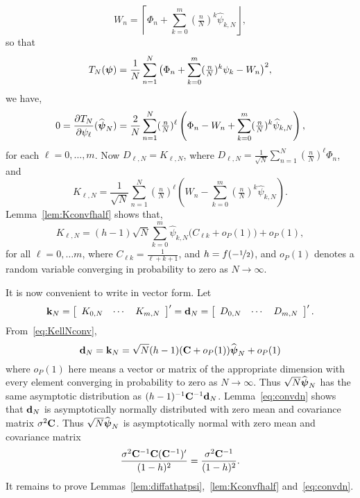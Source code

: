 \documentclass[aap,preprint]{imsart}
\newcommand{\round}[1]{{\left\lceil #1 \right\rfloor}}
\begin{document}
\begin{equation}\label{eq:Wn}
W_{n} = \round{\Phi_n + \sum_{k=0}^m (\tfrac{n}{N})^k \widehat{\psi}_{k,N}},
\end{equation}
so that 
\[
T_{N}(\boldsymbol{\psi}) = \frac{1}{N} \sum_{n=1}^{N} \big( \Phi_n + \sum_{k=0}^m (\tfrac{n}{N})^k \psi_k  - W_n \big)^2,
\] 
we have,
\begin{align*}
0  = \frac{\partial T_N}{\partial \psi_\ell}(\widehat{\psibf}_N) = \frac{2}{N}\sum_{n=1}^{N}(\tfrac{n}{N})^\ell\left( \Phi_n - W_{n}+ \sum_{k=0}^{m}(\tfrac{n}{N})^k \widehat{\psi}_{k,N}  \right),
\end{align*}
for each $\ell = 0, \dots, m$.  Now $D_{\ell,N} = K_{\ell,N}$, where $D_{\ell,N} = \frac{1}{\sqrt{N}} \sum_{n=1}^{N}(\tfrac{n}{N})^\ell \Phi_n$, and
\begin{equation}\label{eq:KellN}
K_{\ell,N} = \frac{1}{\sqrt{N}}\sum_{n=1}^{N}(\tfrac{n}{N})^\ell\left(W_{n}- \sum_{k=0}^{m}(\tfrac{n}{N})^k \widehat{\psi}_{k,N}  \right).
\end{equation}
Lemma~\ref{lem:Kconvfhalf} shows that,
\begin{equation}\label{eq:KellNconv}
K_{\ell,N} =  (h - 1) \sqrt{N} \sum_{k=0}^{m}  \widehat{\psi}_{k,N} \big( C_{\ell k} + o_P(1) \big) + o_P(1),
\end{equation}
for all $\ell = 0, \dots m$, where $C_{\ell k} =  \tfrac{1}{\ell + k + 1}$, and $h = f(-\nicefrac{1}{2})$, and $o_P(1)$ denotes a random variable converging in probability to zero as $N\rightarrow\infty$.

It is now convenient to write in vector form.  Let 
\begin{equation}\label{eq:dnandkn}
\kbf_N = 
\left[
\begin{array}{ccc}%
K_{0,N}  & \cdots & K_{m,N}
\end{array}
\right]^\prime
=
\dbf_N = \left[
\begin{array}{ccc}%
D_{0,N}  & \cdots & D_{m,N}
\end{array}
\right]^\prime.
\end{equation}
From~\eqref{eq:KellNconv},
\[
\mathbf{d}_N = \mathbf{k}_N = \sqrt{N} (h - 1)(\mathbf{C} + o_P(1)) \widehat{\boldsymbol{\psi}}_N + o_P(1)
\]
where $o_P(1)$ here means a vector or matrix of the appropriate dimension with every element converging in probability to zero as $N\rightarrow\infty$.  Thus $\sqrt{N}\widehat{\boldsymbol{\psi}}_N$ has the same asymptotic distribution as $(h - 1)^{-1}\mathbf{C}^{-1} \mathbf{d}_N$.  Lemma~\ref{eq:convdn} shows that $\mathbf{d}_N$ is asymptotically normally distributed with zero mean and covariance matrix $\sigma^2\mathbf{C}$.  Thus $\sqrt{N}\widehat{\boldsymbol{\psi}}_N$ is asymptotically normal with zero mean and covariance matrix
\[
\frac{\sigma^2\mathbf{C}^{-1}\mathbf{C}(\mathbf{C}^{-1})^\prime}{(1 - h)^2} = 
\frac{\sigma^2\mathbf{C}^{-1}}{(1 - h)^2}.
\] 
It remains to prove Lemmas~\ref{lem:diffathatpsi},~\ref{lem:Kconvfhalf} and~\ref{eq:convdn}.
\end{document}
